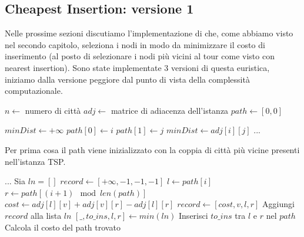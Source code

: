 \documentclass[a4paper,12pt]{report}
\begin{document}
\subsection{Cheapest Insertion: versione 1}
Nelle prossime sezioni discutiamo l'implementazione di  che, come abbiamo visto nel secondo capitolo, seleziona i nodi in modo da minimizzare il costo di inserimento (al posto di selezionare i nodi più vicini al tour come visto con nearest insertion). Sono state implementate 3 versioni di questa euristica, iniziamo dalla versione peggiore dal punto di vista della complessità computazionale.
\begin{tcolorbox}[colframe=black, colback=white, boxrule=0.5pt, title=Cheapest Insertion Versione 1, coltitle=black, fonttitle=\bfseries, colbacktitle=white, breakable]
  \begin{algorithmic}[1]
    \State $n \gets$ numero di città
    \State $adj \gets$ matrice di adiacenza dell'istanza
    \State $path \gets [0, 0]$
    
    \State $minDist \gets +\infty$
          \State $path[0] \gets i$
          \State $path[1] \gets j$
          \State $minDist \gets adj[i][j]$
        \EndIf
      \EndFor
    \EndFor
    \State ...
  \end{algorithmic}
\end{tcolorbox}
Per prima cosa il path viene inizializzato con la coppia di città più vicine presenti nell'istanza TSP.
\begin{tcolorbox}[colframe=black, colback=white, boxrule=0.5pt, title=Cheapest Insertion Versione 1, coltitle=black, fonttitle=\bfseries, colbacktitle=white, breakable]
  \begin{algorithmic}[1]
    \State ...
      \State Sia $ln = []$
        \State $record \gets [+\infty, -1, -1, -1]$
          \State $l \gets path[i]$
          \State $r \gets path[(i + 1) \mod len(path)]$
          \State $cost \gets adj[l][v] + adj[v][r] - adj[l][r]$
            \State $record \gets [cost, v, l, r]$
          \EndIf
        \EndFor
        \State Aggiungi $record$ alla lista $ln$
      \EndFor
      \State $[\_, to\_ins, l, r] \gets min(ln)$
      \State Inserisci $to\_ins$ tra $l$ e $r$ nel $path$
    \EndWhile
    \State Calcola il costo del path trovato
  \end{algorithmic}
\end{tcolorbox}
\end{document}
